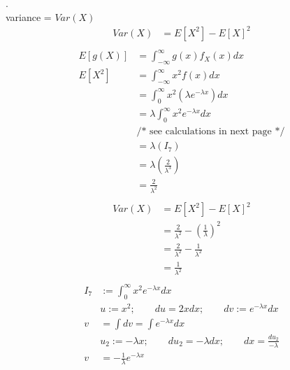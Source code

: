 \documentclass[12pt,border=4pt,multi]{article}%
\begin{document}
\newpage
{}.\\
variance = $Var(X)$\\
\begin{align*}
Var(X) &= E[X^2] - E[X]^2\\
\end{align*}
\begin{align*}
E[g(X)] &= \int_{-\infty}^{\infty} g(x) f_X(x) dx\\ 
E[X^2] &= \int_{-\infty}^{\infty} x^2 f(x) dx\\
&= \int_0^{\infty} x^2\left(\lambda e^{-\lambda x}\right)dx\\
&= \lambda \int_0^{\infty} x^2 e^{-\lambda x}dx\\
&\text{/* see calculations in next page */}\\
&= \lambda (I_7)\\
&= \lambda \left(\frac{2}{\lambda^3}\right)\\
&= \frac{2}{\lambda^2}\\
\end{align*}
\begin{align*}
Var(X) &= E[X^2] - E[X]^2\\
&= \frac{2}{\lambda^2} - \left(\frac{1}{\lambda}\right)^2\\
&= \frac{2}{\lambda^2} - \frac{1}{\lambda^2}\\
&= \boxed{\frac{1}{\lambda^2}}\\
\end{align*}
\begin{align*}
I_7 &:= \int_0^{\infty} x^2e^{-\lambda x} dx\\
&u := x^2;\qquad du = 2xdx;\qquad dv := e^{-\lambda x}dx\\
v &= \int dv = \int e^{-\lambda x}dx\\
&u_2 := -\lambda x; \qquad du_2 = -\lambda dx; \qquad dx = \frac{du_2}{-\lambda}\\
v &= -\frac{1}{\lambda} e^{-\lambda x}\\
\end{align*}
\end{document}
